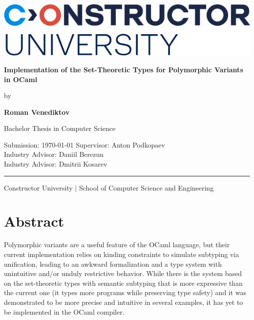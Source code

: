 \documentclass[a4paper,11pt,oneside]{article}
\theoremstyle{definition}
\newcommand{\mylastname}{Venediktov}
\newcommand{\myfirstname}{Roman}
\newcommand{\myname}{\myfirstname{} \mylastname{}}
\newcommand{\mytitle}{Implementation of the Set-Theoretic Types
                      for Polymorphic Variants in OCaml}
\newcommand{\mysupervisor}{Anton Podkopaev}
\newcommand{\myrao}{Daniil Berezun}
\newcommand{\myrat}{Dmitrii Kosarev}
\begin{document}

\thispagestyle{empty}

\begin{flushright}
  \includegraphics[scale=0.8]{bsc-logo}
\end{flushright}
\vspace*{40mm}
\begin{center}
  \huge
  \textbf{\mytitle}
\end{center}
\vspace*{4mm}
\begin{center}
  \Large by
\end{center}
\vspace*{4mm}
\begin{center}
  \LARGE
  \textbf{\myname}
\end{center}
\vspace*{20mm}
\begin{center}
  \Large
  Bachelor Thesis in Computer Science
\end{center}
\vfill
\begin{flushleft}
  \large
  Submission: \today \hfill
  Supervisor: \mysupervisor\\ \hfill
  Industry Advisor: \myrao\\ \hfill
  Industry Advisor: \myrat\\
  \rule{\textwidth}{1pt}
\end{flushleft}
\begin{center}
  Constructor University $|$
  School of Computer Science and Engineering
\end{center}

\newpage

\section*{Abstract}

Polymorphic variants are a useful feature of the OCaml language, but their current implementation relies on kinding constraints to simulate subtyping via unification, leading to an awkward formalization and a type system with unintuitive and/or unduly restrictive behavior.
While there is the system based on the set-theoretic types with semantic subtyping that is more expressive than the current one (it types more programs while preserving type safety) and it was demonstrated to be more precise and intuitive in several examples, it has yet to be implemented in the OCaml compiler.
\end{document}
